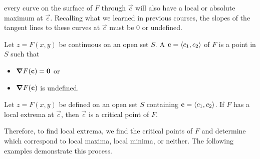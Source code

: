 \documentclass{ximera}
\begin{document}
every curve on the surface of $F$ through $\vec{c}$ will also have a
local or absolute maximum at $\vec{c}$. Recalling what we learned in
previous courses, the slopes of the tangent lines to these curves at
$\vec{c}$ must be $0$ or undefined.


\begin{definition}
  Let $z = F(x,y)$ be continuous on an open set $S$. A
   $\mathbf{c}=\left\langle c_1,c_2\right\rangle$ of $F$ is a point in $S$ such
  that
  \begin{itemize}
  \item $\boldsymbol\nabla F(\mathbf{c}) = \mathbf{0}$ or
  \item $\boldsymbol\nabla F(\mathbf{c})$ is undefined.
  \end{itemize}
\end{definition}

\begin{theorem}
Let $z=F(x,y)$ be defined on an open set $S$ containing
$\mathbf{c}=\left\langle c_1,c_2\right\rangle$. If $F$ has a local extrema at $\vec{c}$, then $\vec{c}$ is a
critical point of $F$.
\end{theorem}

Therefore, to find local extrema, we find the critical points of
$F$ and determine which correspond to local maxima, local
minima, or neither. The following examples demonstrate this process.
\end{document}
